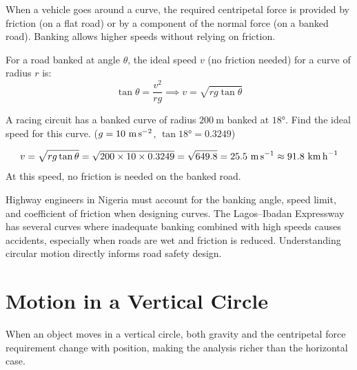 When a vehicle goes around a curve, the required
centripetal force is provided by friction (on a flat
road) or by a component of the normal force (on a
banked road). Banking allows higher speeds without
relying on friction.

\begin{lawbox}
For a road banked at angle $\theta$, the ideal speed
$v$ (no friction needed) for a curve of radius $r$ is:
\[
  \tan\theta = \frac{v^2}{rg}
  \implies v = \sqrt{rg\tan\theta}
\]
\end{lawbox}

\begin{examplebox}[6.3]
A racing circuit has a banked curve of radius
$200\ \text{m}$ banked at $18°$. Find the ideal
speed for this curve. ($g = 10\ \text{m\,s}^{-2}$,
$\tan 18° = 0.3249$)
\end{examplebox}

\begin{solutionbox}
\[
  v = \sqrt{rg\tan\theta}
  = \sqrt{200 \times 10 \times 0.3249}
  = \sqrt{649.8}
  = 25.5\ \text{m\,s}^{-1}
  \approx 91.8\ \text{km\,h}^{-1}
\]
At this speed, no friction is needed on the banked road.
\end{solutionbox}

\begin{realworldbox}
Highway engineers in Nigeria must account for the
banking angle, speed limit, and coefficient of friction
when designing curves. The Lagos--Ibadan Expressway
has several curves where inadequate banking combined
with high speeds causes accidents, especially when
roads are wet and friction is reduced. Understanding
circular motion directly informs road safety design.
\end{realworldbox}

\section{Motion in a Vertical Circle}

When an object moves in a vertical circle, both gravity
and the centripetal force requirement change with
position, making the analysis richer than the
horizontal case.

